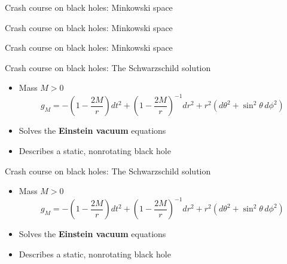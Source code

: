 \documentclass[compress,usenames,dvipsnames,8pt]{beamer}
\theoremstyle{definition}
\renewcommand{\(}{\begin{columns}}
\renewcommand{\)}{\end{columns}}
\newcommand{\<}[1]{\begin{column}{#1}}
\renewcommand{\>}{\end{column}}
\begin{document}
\begin{frame}{Crash course on black holes: Minkowski space}
\addtocounter{framenumber}{-1}
\begin{figure}
 \def\svgwidth{9pc}

\end{figure}

\end{frame}

\begin{frame}{Crash course on black holes: Minkowski space}
\addtocounter{framenumber}{-1}
\begin{figure}
 \def\svgwidth{9pc}

\end{figure}

\end{frame}

\begin{frame}{Crash course on black holes: Minkowski space}
\addtocounter{framenumber}{-1}
\begin{figure}
 \def\svgwidth{9pc}

\end{figure}

\end{frame}

\begin{frame}{Crash course on black holes: The Schwarzschild solution}

\begin{itemize}
\item Mass $M>0$ 
\[g_M= -\left(1-\frac{2M}{r}\right)dt^2 +\left(1-\frac{2M}{r}\right)^{-1}dr^2 + r^2(d\theta^2+\sin^2\theta\,d\phi^2)\]
\item Solves the \textbf{Einstein vacuum} equations
\item Describes a static, nonrotating black hole
\end{itemize}
\pause

\begin{figure}
 \def\svgwidth{20pc}

\end{figure}



\end{frame}


\begin{frame}{Crash course on black holes: The Schwarzschild solution}

\begin{itemize}
\item Mass $M>0$ 
\[g_M= -\left(1-\frac{2M}{r}\right)dt^2 +\left(1-\frac{2M}{r}\right)^{-1}dr^2 + r^2(d\theta^2+\sin^2\theta\,d\phi^2)\]
\item Solves the \textbf{Einstein vacuum} equations
\item Describes a static, nonrotating black hole
\end{itemize}
\begin{figure}
 \def\svgwidth{20pc}

\end{figure}

\addtocounter{framenumber}{-1}



\end{frame}
\end{document}
